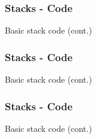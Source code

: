 \begin{frame}\frametitle{Stacks - Code}
Basic stack code (cont.)

\end{frame}

\begin{frame}\frametitle{Stacks - Code}
Basic stack code (cont.)

\end{frame}

\begin{frame}\frametitle{Stacks - Code}
Basic stack code (cont.)

\end{frame}

